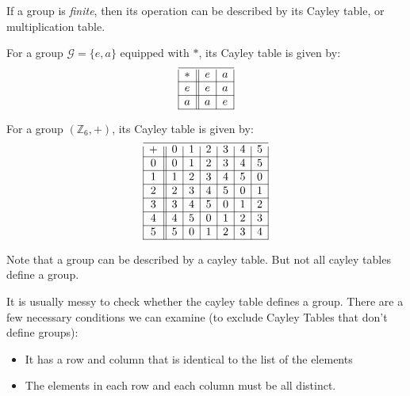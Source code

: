 If a group is \emph{finite}, then its operation can be described by its Cayley table, or multiplication table.
\begin{example}
For a group $\mathcal{G}=\{e,a\}$ equipped with $*$, its Cayley table is given by: 
\[\begin{array}{|c||c|c|}
\hline
* & e & a  \\
\hline
e& e & a \\
\hline
a & a & e \\
\hline
\end{array}\]

For a group $(\mathbb{Z}_6,+)$, its Cayley table is given by: 
\[\begin{array}{|c||c|c|c|c|c|c|}
\hline
+&0&1&2&3&4&5
\\\hline
0&0&1&2&3&4&5
\\\hline
1&1&2&3&4&5&0
\\\hline
2&2&3&4&5&0&1
\\\hline
3&3&4&5&0&1&2
\\\hline
4&4&5&0&1&2&3
\\\hline
5&5&0&1&2&3&4
\\\hline
\end{array}\]
\end{example}
\begin{remark}
Note that a group can be described by a cayley table. But not all cayley tables define a group.
\end{remark}
\begin{remark}
It is usually messy to check whether the cayley table defines a group. There are a few necessary conditions we can examine (to exclude Cayley Tables that don't define groups):
\begin{itemize}
\item
It has a row and column that is identical to the list of the elements
\item
The elements in each row and each column must be all distinct.
\end{itemize}
\end{remark}

















